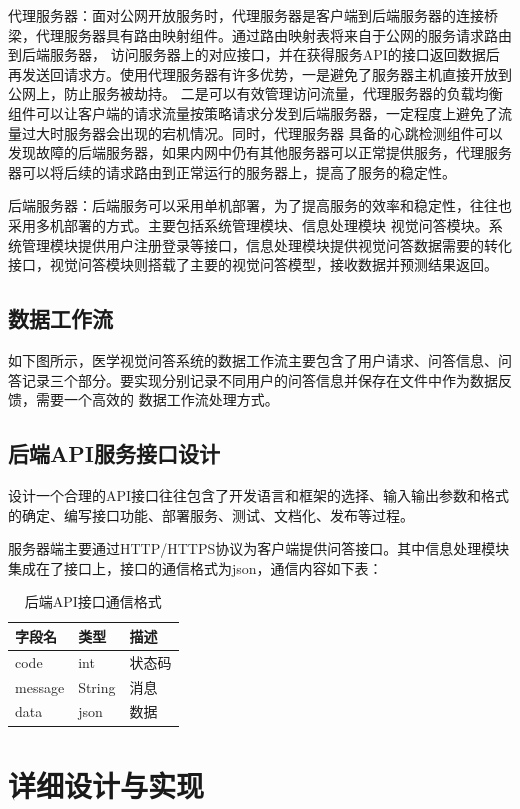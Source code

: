 代理服务器：面对公网开放服务时，代理服务器是客户端到后端服务器的连接桥梁，代理服务器具有路由映射组件。通过路由映射表将来自于公网的服务请求路由到后端服务器，
访问服务器上的对应接口，并在获得服务API的接口返回数据后再发送回请求方。使用代理服务器有许多优势，一是避免了服务器主机直接开放到公网上，防止服务被劫持。
二是可以有效管理访问流量，代理服务器的负载均衡组件可以让客户端的请求流量按策略请求分发到后端服务器，一定程度上避免了流量过大时服务器会出现的宕机情况。同时，代理服务器
具备的心跳检测组件可以发现故障的后端服务器，如果内网中仍有其他服务器可以正常提供服务，代理服务器可以将后续的请求路由到正常运行的服务器上，提高了服务的稳定性。

后端服务器：后端服务可以采用单机部署，为了提高服务的效率和稳定性，往往也采用多机部署的方式。主要包括系统管理模块、信息处理模块
视觉问答模块。系统管理模块提供用户注册登录等接口，信息处理模块提供视觉问答数据需要的转化接口，视觉问答模块则搭载了主要的视觉问答模型，接收数据并预测结果返回。

\subsection{数据工作流}
如下图所示，医学视觉问答系统的数据工作流主要包含了用户请求、问答信息、问答记录三个部分。要实现分别记录不同用户的问答信息并保存在文件中作为数据反馈，需要一个高效的
数据工作流处理方式。
\subsection{后端API服务接口设计}
设计一个合理的API接口往往包含了开发语言和框架的选择、输入输出参数和格式的确定、编写接口功能、部署服务、测试、文档化、发布等过程。

服务器端主要通过HTTP/HTTPS协议为客户端提供问答接口。其中信息处理模块集成在了接口上，接口的通信格式为json，通信内容如下表：
\begin{table}
    \caption{\label{tab:sys_api}后端API接口通信格式}
    \centering
    \small
    \begin{tabular}{lll}
        \hline 字段名 & 类型 & 描述  \\
        \hline code & int & 状态码  \\
		message & String & 消息 \\
		data & json & 数据 \\
        \hline
        \end{tabular}
\end{table}	
\section{详细设计与实现}
